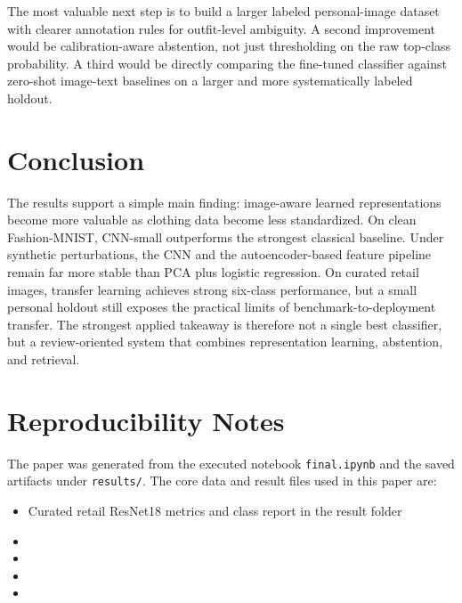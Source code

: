 \documentclass[11pt]{article}
\begin{document}
The most valuable next step is to build a larger labeled personal-image dataset with clearer annotation rules for outfit-level ambiguity. A second improvement would be calibration-aware abstention, not just thresholding on the raw top-class probability. A third would be directly comparing the fine-tuned classifier against zero-shot image-text baselines on a larger and more systematically labeled holdout.

\section{Conclusion}

The results support a simple main finding: image-aware learned representations become more valuable as clothing data become less standardized. On clean Fashion-MNIST, CNN-small outperforms the strongest classical baseline. Under synthetic perturbations, the CNN and the autoencoder-based feature pipeline remain far more stable than PCA plus logistic regression. On curated retail images, transfer learning achieves strong six-class performance, but a small personal holdout still exposes the practical limits of benchmark-to-deployment transfer. The strongest applied takeaway is therefore not a single best classifier, but a review-oriented system that combines representation learning, abstention, and retrieval.

\appendix
\section{Reproducibility Notes}

The paper was generated from the executed notebook \texttt{final.ipynb} and the saved artifacts under \texttt{results/}. The core data and result files used in this paper are:

\begin{itemize}
  \item Curated retail ResNet18 metrics and class report in the  result folder
  \item {}
  \item {}
  \item {}
  \item {}
\end{itemize}
\end{document}
